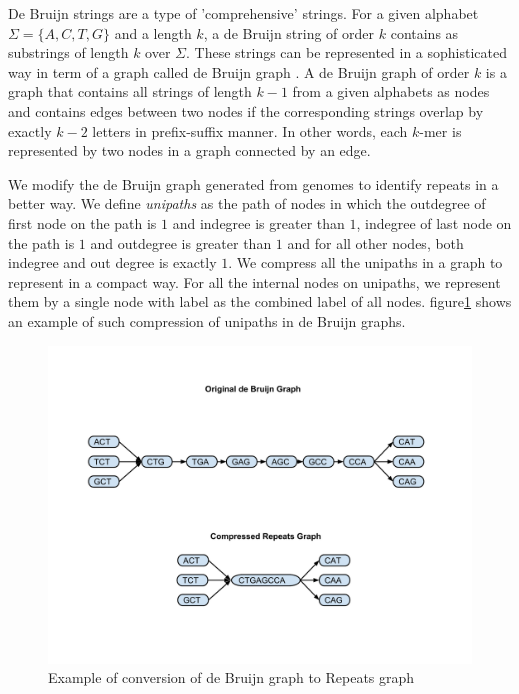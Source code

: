 \documentclass[runningheads,a4paper]{llncs}
\begin{document}
De Bruijn strings are a type of 'comprehensive' strings. For a given alphabet $\Sigma = \{A,C,T,G\}$ and a length $k$, a de Bruijn string of order $k$ contains as substrings of length $k$ over $\Sigma$. These strings can be represented in a sophisticated way in term of a graph called de Bruijn graph \cite{debruijn}. A de Bruijn graph of order $k$ is a graph that contains all strings of length $k-1$ from a given alphabets as nodes and contains edges between two nodes if the corresponding strings overlap by exactly $k-2$ letters in prefix-suffix manner. In other words, each $k$-mer is represented by two nodes in a graph connected by an edge. 

We modify the de Bruijn graph generated from genomes to identify repeats in a better way. We define \textit{unipaths} as the path of nodes in which the outdegree of first node on the path is $1$ and indegree is greater than $1$, indegree of last node on the path is $1$ and outdegree is greater than $1$ and for all other nodes, both indegree and out degree is exactly $1$. We compress all the unipaths in a graph to represent in a compact way. For all the internal nodes on unipaths, we represent them by a single node with label as the combined label of all nodes. figure\ref{fig:repeatgraph} shows an example of such compression of unipaths in de Bruijn graphs. 

\begin{figure}[htbp]
\centering
\includegraphics[width = \textwidth]{repeatgraph}
\caption{Example of conversion of de Bruijn graph to Repeats graph}
\label{fig:repeatgraph}
\end{figure}
\end{document}
